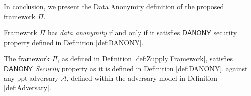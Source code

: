 In conclusion, we present the Data Anonymity definition of the proposed framework $\Pi$. 
\begin{definition}
    \label{def:Data Anonymity}
    Framework $\Pi$ has \textit{data anonymity}  if and only if it satisfies $\mathsf{DANONY}$ security property defined in Definition \ref{def:DANONY}.
\end{definition}


    \begin{theorem}
        \label{theorem:DANONY}
        The framework $\Pi$, as defined in Definition \ref{def:Zupply Framework}, satisfies \textit{$\mathsf{DANONY}$ Security} property as it is defined in Definition \ref{def:DANONY}, against any \gls{ppt} adversary $\mathcal{A}$, defined within the adversary model in Definition \ref{def:Adversary}.
    \end{theorem}
